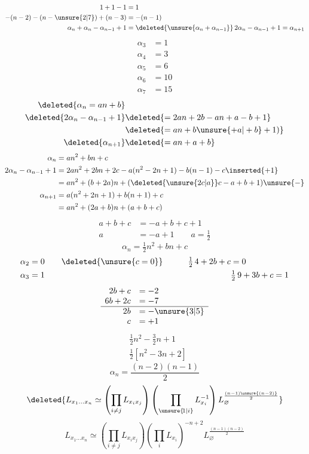 \[
\begin{aligned}
1+1-1&=1\\
-(n-2)-(n-\unsure{2|7})+(n-3)&=-(n-1)\\
\alpha_n+\alpha_n-\alpha_{n-1}+1&=\deleted{\unsure{\alpha_n+\alpha_{n-1}}}\,2\alpha_n-\alpha_{n-1}+1=\alpha_{n+1}
\end{aligned}
\]
\[
\begin{aligned}
\alpha_3&=1\\ \alpha_4&=3\\ \alpha_5&=6\\ \alpha_6&=10\\ \alpha_7&=15
\end{aligned}
\]
\[
\begin{aligned}
\deleted{\alpha_n=an+b}&\\
\deleted{2\alpha_n-\alpha_{n-1}+1}&\deleted{=2an+2b-an+a-b+1}\\
&\deleted{=an+b\unsure{+a|+b}+1)}\\
\deleted{\alpha_{n+1}}&\deleted{=an+a+b}
\end{aligned}
\]
\[
\begin{aligned}
\alpha_n&=an^2+bn+c\\
2\alpha_n-\alpha_{n-1}+1&=2an^2+2bn+2c-a(n^2-2n+1)-b(n-1)-c\inserted{+1}\\
&=an^2+(b+2a)n+(\deleted{\unsure{2c|a}}c-a+b+1)\unsure{-}\\
\alpha_{n+1}&=a(n^2+2n+1)+b(n+1)+c\\
&=an^2+(2a+b)n+(a+b+c)
\end{aligned}
\]
\[
\begin{aligned}
a+b+c&=-a+b+c+1\\
a&=-a+1\qquad a=\tfrac12
\end{aligned}
\]
\[
\alpha_n=\tfrac12 n^2+bn+c
\]
\[
\begin{aligned}
\alpha_2&=0\qquad \deleted{\unsure{c=0}}\qquad &\tfrac12\,4+2b+c&=0\\
\alpha_3&=1&&\tfrac12\,9+3b+c=1
\end{aligned}
\]
\[
\begin{array}{rl}
2b+c&=-2\\6b+2c&=-7\\ \hline
2b&=-\unsure{3|5}\\c&=+1
\end{array}
\]
\[
\begin{aligned}
&\tfrac12 n^2-\tfrac32 n+1\\
&\tfrac12[n^2-3n+2]
\end{aligned}
\]
\[
\boxed{\alpha_n=\frac{(n-2)(n-1)}{2}}
\]
\[
\deleted{L_{x_1\ldots x_n}\simeq
\left(\prod_{i\ne j}L_{x_ix_j}\right)
\left(\prod_{\unsure{\!1|i}} L_{x_i}^{-1}\right)L_{\varnothing}^{\frac{(n-1)\unsure{(n-2)}}{2}}}
\]
\[
\boxed{L_{x_1\ldots x_n}\simeq \left(\prod_{i\ne j}L_{x_ix_j}\right)
\left(\prod_i L_{x_i}\right)^{-n+2}L_{\varnothing}^{\frac{(n-1)(n-2)}2}}
\]
